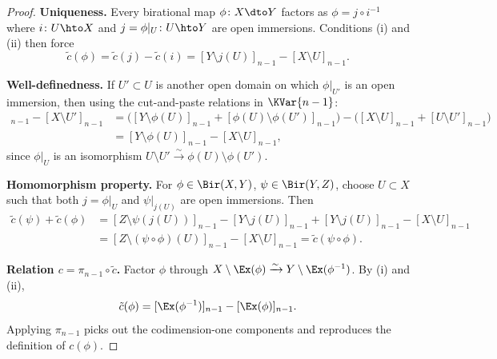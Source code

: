 \begin{proof}
  \textbf{Uniqueness.}  Every birational map \(\phi \colon X \dto Y\) factors as
  \(\phi = j \circ i^{-1}\) where \(i \colon U \hto X\) and \(j = \phi|_U \colon U \hto Y\)
  are open immersions.  Conditions (i) and (ii) then force
  \[
    \tilde{c}(\phi) = \tilde{c}(j) - \tilde{c}(i)
    = [Y \setminus j(U)]_{n-1} - [X \setminus U]_{n-1}.
  \]

  \textbf{Well-definedness.}  If \(U' \subset U\) is another open domain on which
  \(\phi|_{U'}\) is an open immersion, then using the cut-and-paste relations in
  \(\KVar{n-1}\):
  \begin{align*}
    [Y \setminus \phi(U')]_{n-1} - [X \setminus U']_{n-1}
    &= \bigl([Y \setminus \phi(U)]_{n-1} + [\phi(U) \setminus \phi(U')]_{n-1}\bigr)
      - \bigl([X \setminus U]_{n-1} + [U \setminus U']_{n-1}\bigr) \\
    &= [Y \setminus \phi(U)]_{n-1} - [X \setminus U]_{n-1},
  \end{align*}
  since \(\phi|_U\) is an isomorphism \(U \setminus U' \xrightarrow{\sim} \phi(U) \setminus \phi(U')\).

  \textbf{Homomorphism property.}  For \(\phi \in \Bir(X,Y)\), \(\psi \in \Bir(Y,Z)\),
  choose \(U \subset X\) such that both \(j = \phi|_U\) and \(\psi|_{j(U)}\) are
  open immersions.  Then
  \begin{align*}
    \tilde{c}(\psi) + \tilde{c}(\phi)
    &= [Z \setminus \psi(j(U))]_{n-1} - [Y \setminus j(U)]_{n-1}
      + [Y \setminus j(U)]_{n-1} - [X \setminus U]_{n-1} \\
    &= [Z \setminus (\psi \circ \phi)(U)]_{n-1} - [X \setminus U]_{n-1}
    = \tilde{c}(\psi \circ \phi).
  \end{align*}

  \textbf{Relation \(c = \pi_{n-1} \circ \tilde{c}\).}  Factor \(\phi\) through
  \(X \setminus \Ex(\phi) \xrightarrow{\sim} Y \setminus \Ex(\phi^{-1})\).  By
  (i) and (ii),
  \[
    \tilde{c}(\phi) = [\Ex(\phi^{-1})]_{n-1} - [\Ex(\phi)]_{n-1}.
  \]
  Applying \(\pi_{n-1}\) picks out the codimension-one components and reproduces
  the definition of \(c(\phi)\).
\end{proof}


